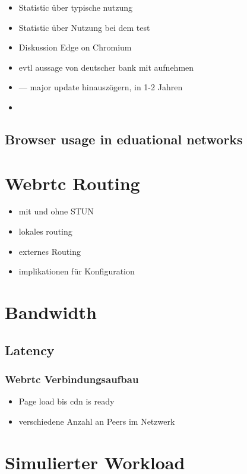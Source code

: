 \begin{itemize}
	\item Statistic über typische nutzung
	\item Statistic über Nutzung bei dem test
	\item Diskussion Edge on Chromium
	\item evtl aussage von deutscher bank mit aufnehmen
	\item  --- major update hinauszögern, in 1-2 Jahren
	\item 
\end{itemize}


\subsection{Browser usage in eduational networks}

\section{Webrtc Routing}
\begin{itemize}
	\item mit und ohne STUN
	\item lokales routing
	\item externes Routing
	\item implikationen für Konfiguration
\end{itemize}
\section{Bandwidth}



\subsection{Latency}

\subsubsection{Webrtc Verbindungsaufbau}

\begin{itemize}
	\item Page load bis cdn is ready
	\item verschiedene Anzahl an Peers im Netzwerk 
\end{itemize}

\section{Simulierter Workload}
